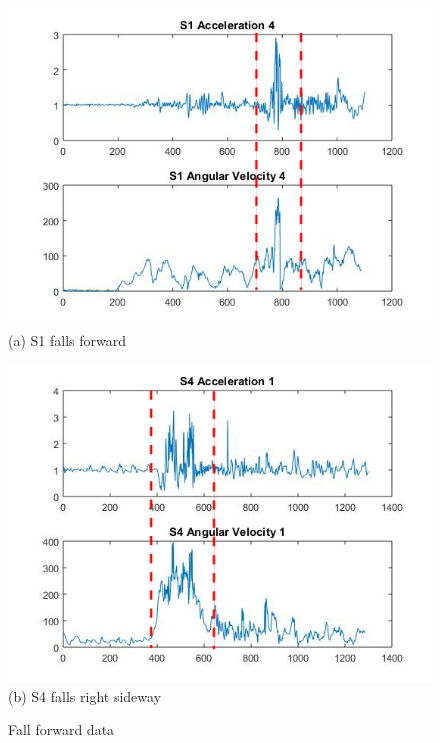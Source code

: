 \documentclass[letterpaper,12pt,titlepage,oneside,final]{book}
\begin{document}
\begin{figure}[h!]
	\hspace{-2.3cm}
	\centering
	\begin{minipage}[b]{0.5\textwidth}
		\centering
		\includegraphics[scale=0.5]{hieu4}
		(a) S1 falls forward
	\end{minipage}%
	\hfill
	\begin{minipage}[b]{0.5\textwidth}
		\centering
		\includegraphics[scale=0.5]{phuc1}
		(b) S4 falls right sideway
	\end{minipage}	
	\caption{Fall forward data}
\end{figure}
\end{document}
